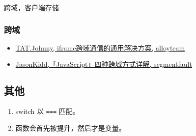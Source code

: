 跨域，客户端存储

\subsubsection{跨域}\hypertarget{section-11}{}\label{section-11}

\begin{itemize}
\item \href{http://www.alloyteam.com/2013/11/the-second-version-universal-solution-iframe-cross-domain-communication/}{ TAT.Johnny, iframe跨域通信的通用解决方案, alloyteam}
\item \href{http://segmentfault.com/a/1190000003642057}{JasonKidd,「JavaScript」四种跨域方式详解, segmentfault}
\end{itemize}

\subsection{其他}\hypertarget{section-12}{}\label{section-12}

\begin{enumerate}
\item switch 以 \texttt{===} 匹配。
\item 函数会首先被提升，然后才是变量。
\end{enumerate}
